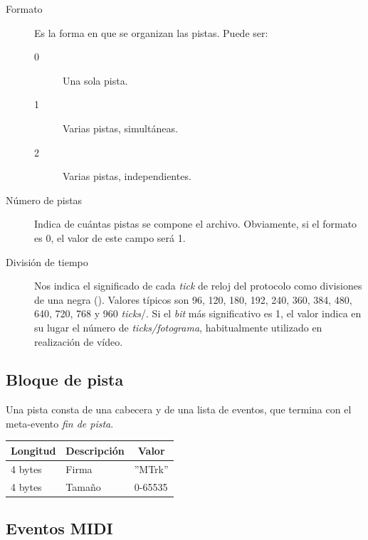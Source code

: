 \begin{description}
	\item[Formato] Es la forma en que se organizan las pistas. Puede ser:
	\begin{description}
		\item[0] Una sola pista.
		\item[1] Varias pistas, simultáneas.
		\item[2] Varias pistas, independientes.
	\end{description}
	
	\item[Número de pistas] Indica de cuántas pistas se compone el archivo. Obviamente, si el formato es 0, el valor de este campo será 1.
	
	\item[División de tiempo] Nos indica el significado de cada \textit{tick} de reloj del protocolo como divisiones de una negra (\quarternote). Valores típicos son 96, 120, 180, 192, 240, 360, 384, 480, 640, 720, 768 y 960 \textit{ticks}/\quarternote. Si el \textit{bit} más significativo es 1, el valor indica en su lugar el número de \textit{ticks/fotograma}, habitualmente utilizado en realización de vídeo.
\end{description}

\subsection{Bloque de pista}

Una pista consta de una cabecera y de una lista de eventos, que termina con el meta-evento \textit{fin de pista}.

\smallskip

\begin{center}
	\begin{tabular}{|l|l|l|}
		\hline \multicolumn{1}{|c|}{\textbf{Longitud}} & \multicolumn{1}{c|}{\textbf{Descripción}} & \multicolumn{1}{c|}{\textbf{Valor}} \\
		\hline 4 bytes & Firma & ''MTrk'' \\ 
		\hline 4 bytes & Tamaño & 0-65535 \\  
		\hline 
	\end{tabular}
	\smallskip
\end{center}

\smallskip

\subsection{Eventos MIDI}

